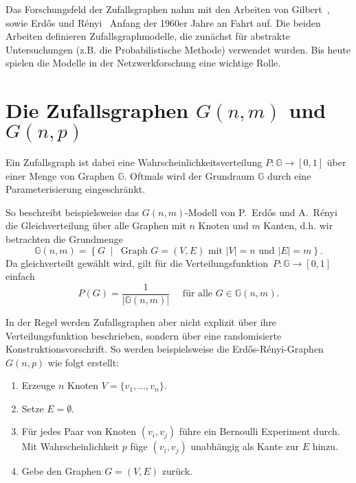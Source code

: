Das Forschungsfeld der Zufallsgraphen nahm mit den Arbeiten von Gilbert~\cite{gilbert_1959}, sowie Erd\H{o}s und R\'enyi~\cite{erdos_renyi_1960} Anfang der 1960er Jahre an Fahrt auf.
Die beiden Arbeiten definieren Zufallsgraphmodelle, die zunächst für abstrakte Untersuchungen (z.B. die Probabilistische Methode) verwendet wurden.
Bis heute spielen die Modelle in der Netzwerkforschung eine wichtige Rolle.

\section{Die Zufallsgraphen $G(n, m)$ und $G(n, p)$}
Ein Zufallsgraph ist dabei eine Wahrscheinlichkeitsverteilung $P\colon \mathbb G \to [0, 1]$ über einer Menge von Graphen $\mathbb G$.
Oftmals wird der Grundraum $\mathbb G$ durch eine Parameterisierung eingeschränkt.

So  beschreibt beispielsweise das $G(n, m)$-Modell von P.~Erd\H{o}s und A.~R\'enyi die Gleichverteilung über alle Graphen mit $n$ Knoten und $m$ Kanten, d.h. wir betrachten die Grundmenge
\begin{equation}
    \mathbb G(n, m) = \left\{ G \  \middle| \  \text{ Graph } G=(V, E) \text{ mit } |V| = n \text{ und } |E| =m \right\}.
\end{equation}
Da gleichverteilt gewählt wird, gilt für die Verteilungsfunktion~{$P\colon \mathbb G \to [0,1]$} einfach
\begin{equation}
    P(G) = \frac{1}{| \mathbb G(n,m) |} \quad \text{ für alle } G \in \mathbb G(n, m).
\end{equation}

In der Regel werden Zufallsgraphen aber nicht explizit über ihre Verteilungsfunktion beschrieben, sondern über eine randomisierte Konstruktionsvorschrift.
So werden beispielsweise die  Erd\H{o}s-R\'enyi-Graphen $G(n, p)$ wie folgt erstellt:
\begin{enumerate}
    \item Erzeuge $n$ Knoten $V = \{v_1, \ldots, v_n\}$.
    \item Setze $E = \emptyset$.
    \item Für jedes Paar von Knoten $(v_i, v_j)$ führe ein Bernoulli Experiment durch.
          Mit Wahrscheinlichkeit $p$ füge $(v_i, v_j)$ unabhängig als Kante zur $E$ hinzu.
    \item Gebe den Graphen $G=(V, E)$ zurück.
\end{enumerate}

